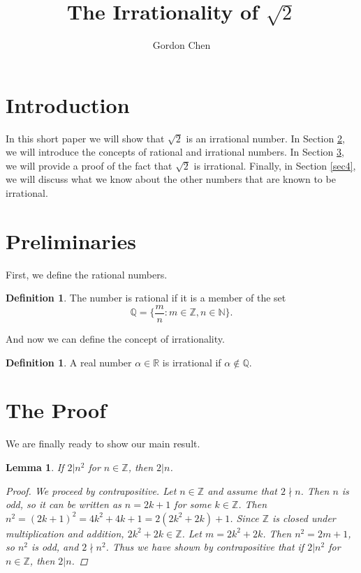 \documentclass[12pt, letterpaper]{article}
\title{The Irrationality of \(\sqrt{2}\)}
\author{Gordon Chen}
\date{}
\newtheorem{lemma}[thm]{Lemma}
\theoremstyle{definition}
\theoremstyle{definition}
\newtheorem{defn}[thm]{Definition}
\begin{document}
\maketitle

\section{Introduction} \label{intro}
In this short paper we will show that \(\sqrt{2}\) is an irrational number.
In Section \ref{sec2}, we will introduce the concepts of rational and irrational numbers.
In Section \ref{sec3}, we will provide a proof of the fact that \(\sqrt{2}\) is irrational.
Finally, in Section \ref{sec4}, we will discuss what we know about the other numbers that are
known to be irrational.


\section{Preliminaries} \label{sec2}
First, we define the rational numbers.

\begin{defn}
    The number is rational if it is a member of the set
    \[ \mathbb{Q} = \{\frac{m}{n} : m \in \mathbb{Z}, n \in \mathbb{N}\}.\]
\end{defn}

And now we can define the concept of irrationality.
\begin{defn}
    A real number \(\alpha \in \mathbb{R}\) is irrational if \(\alpha \notin \mathbb{Q}\).
\end{defn}


\section{The Proof} \label{sec3}
We are finally ready to show our main result.

\begin{lemma} \label{lemma_div2}
    If \(2 | n^2\) for \(n \in \mathbb{Z}\), then \(2|n\).

    \begin{proof}
        We proceed by contrapositive. Let \(n \in \mathbb{Z}\) and assume that \(2 \nmid n\).
        Then \(n\) is odd, so it can be written as \(n = 2k + 1\) for some \(k \in \mathbb{Z}\).
        Then \(n^2  = (2k+1)^2 = 4k^2 + 4k + 1 = 2(2k^2 + 2k) + 1\). Since \(\mathbb{Z}\) is closed
        under multiplication and addition, \(2k^2 + 2k \in \mathbb{Z}\). Let \(m = 2k^2 + 2k\).
        Then \(n^2 = 2m + 1\), so \(n^2\) is odd, and \(2 \nmid n^2\).
        Thus we have shown by contrapositive that
        if \(2 | n^2\) for \(n \in \mathbb{Z}\), then \(2|n\).
    \end{proof}
\end{lemma}
\end{document}
